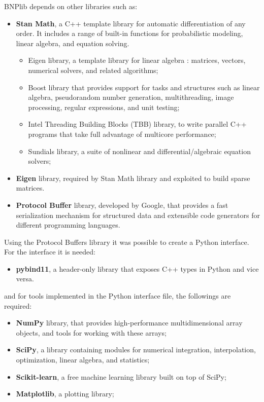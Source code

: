 BNPlib depends on other libraries such as:
\begin{itemize}

\item \textbf{Stan Math}, a C++ template library for automatic differentiation of any order. It includes a range of built-in functions for probabilistic modeling, linear algebra, and equation solving.
	\begin{itemize}
			\item Eigen library, a template library for linear algebra : matrices, vectors, numerical solvers, and related algorithms;
			\item Boost library that provides support for tasks and structures such as linear algebra, pseudorandom number generation, multithreading, image processing, regular expressions, and unit testing;
			\item Intel Threading Building Blocks (TBB) library, to write parallel C++ programs that take full advantage of multicore performance;
			\item Sundials library, a suite of nonlinear and differential/algebraic equation solvers;
	\end{itemize}
	
\item \textbf{Eigen} library, required by Stan Math library and exploited to build sparse matrices. 

\item \textbf{Protocol Buffer} library, developed by Google, that provides a fast serialization mechanism for structured data and extensible code generators for different programming languages.

\end{itemize}
Using the Protocol Buffers library it was possible to create a Python interface. For the interface it is needed:
\begin{itemize}
\item \textbf{pybind11}, a header-only library that exposes C++ types in Python and vice versa.
\end{itemize}
and for tools implemented in the Python interface file, the followings are required:
\begin{itemize}
\item \textbf{NumPy} library, that provides high-performance multidimensional array objects, and tools for working with these arrays;
\item \textbf{SciPy}, a library containing modules for numerical integration, interpolation, optimization, linear algebra, and statistics;
\item \textbf{Scikit-learn}, a free machine learning library built on top of SciPy;
\item \textbf{Matplotlib}, a plotting library;
\end{itemize}


